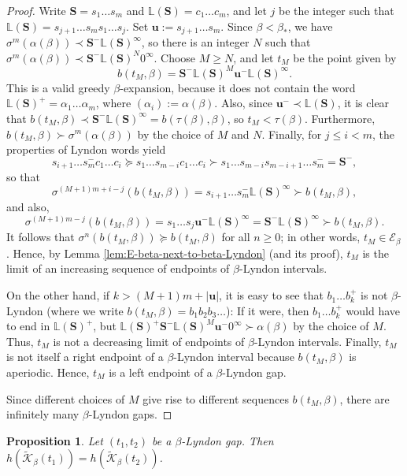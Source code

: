 \documentclass[11pt]{amsart}
\newtheorem{proposition}[theorem]{Proposition}
\theoremstyle{definition}
\theoremstyle{remark}
\numberwithin{equation}{section}
\renewcommand{\L}{\ensuremath{\mathbb{L}}}
\newcommand{\EE}{\mathscr{E}}
\newcommand{\Kt}{\widetilde{\mathcal{K}}}
\newcommand{\cs}{ {\mathbf{S}}}
\renewcommand{\u}{\mathbf{u}}
\newcommand{\f}{\infty}
\newcommand{\al}{\alpha}
\newcommand{\lge}{\succcurlyeq}
\begin{document}
\begin{proof}
Write $\cs=s_1\dots s_m$ and $\L(\cs)=c_1\dots c_m$, and let $j$ be the integer such that $\L(\cs)=s_{j+1}\dots s_m s_1\dots s_j$. Set $\u:=s_{j+1}\dots s_m$. Since $\beta<\beta_*$, we have $\sigma^m(\alpha(\beta))\prec \cs^-\L(\cs)^\f$, so there is an integer $N$ such that $\sigma^m(\alpha(\beta))\prec \cs^-\L(\cs)^N 0^\f$. Choose $M\geq N$, and let $t_M$ be the point given by
\[
b(t_M,\beta)=\cs^-\L(\cs)^M \u^- \L(\cs)^\f.
\]
This is a valid greedy $\beta$-expansion, because it does not contain the word $\L(\cs)^+=\alpha_1\dots\alpha_m$, where $(\al_i):=\al(\beta)$. Also, since $\u^-\prec \L(\cs)$, it is clear that $b(t_M,\beta)\prec \cs^-\L(\cs)^\f=b(\tau(\beta),\beta)$, so $t_M<\tau(\beta)$. Furthermore, $b(t_M,\beta)\succ \sigma^m(\alpha(\beta))$ by the choice of $M$ and $N$. Finally, for $j\leq i<m$, the properties of Lyndon words yield
\[
s_{i+1}\dots s_m^- c_1\dots c_i \lge s_1\dots s_{m-i} c_1\dots c_i \succ s_1\dots s_{m-i} s_{m-i+1}\dots s_m^-={\cs^-},
\]
so that
\[
\sigma^{(M+1)m+i-j}(b(t_M,\beta))=s_{i+1}\dots s_m^-\L(\cs)^\f \succ b(t_M,\beta),
\]
and also,
\[
\sigma^{(M+1)m-j}(b(t_M,\beta))=s_1\dots s_j \u^-\L(\cs)^\f=\cs^-\L(\cs)^\f \succ b(t_M,\beta).
\]
It follows that $\sigma^n(b(t_M,\beta))\lge b(t_M,\beta)$ for all $n\geq 0$; in other words, $t_M\in\EE_\beta$. Hence, by Lemma \ref{lem:E-beta-next-to-beta-Lyndon} (and its proof), $t_M$ is the limit of an increasing sequence of endpoints of $\beta$-Lyndon intervals.

On the other hand, if $k>(M+1)m+|\u|$, it is easy to see that $b_1\dots b_k^+$ {is not $\beta$-Lyndon} (where we write $b(t_M,\beta)=b_1b_2b_3\dots$): If it were, then $b_1\dots b_k^+$ would have to end in $\L(\cs)^+$, but $\L(\cs)^+\cs^-\L(\cs)^M \u^-0^\f\succ\al(\beta)$ by the choice of $M$. Thus, $t_M$ is not a decreasing limit of endpoints of $\beta$-Lyndon intervals. Finally, $t_M$ is not itself a right endpoint of a $\beta$-Lyndon interval because $b(t_M,\beta)$ is aperiodic. Hence, $t_M$ is a left endpoint of a $\beta$-Lyndon gap.

Since different choices of $M$ give rise to different sequences $b(t_M,\beta)$, there are infinitely many $\beta$-Lyndon gaps.
\end{proof}

\begin{proposition} \label{prop:beta-Lyndon-gap-entropy}
Let $(t_1,t_2)$ be a $\beta$-Lyndon gap. Then $h(\Kt_\beta(t_1))=h(\Kt_\beta(t_2))$.
\end{proposition}
\end{document}
